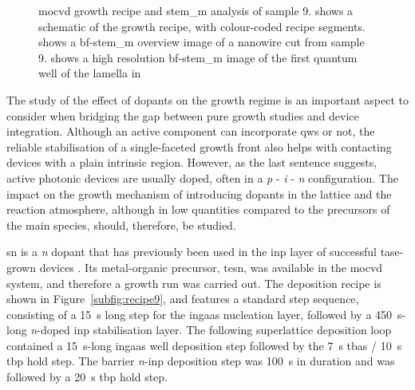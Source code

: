 \begin{figure}
{    }
    \caption{\acs{mocvd} growth recipe and \acs{stem_m} analysis of sample 9.  shows a schematic of the growth recipe, with colour-coded recipe segments.  shows a \acs{bf}-\acs{stem_m} overview image of a nanowire cut from sample 9.  shows a high resolution \acs{bf}-\acs{stem_m} image of the first quantum well of the lamella in }
    \label{fig:s9_recipe_stem}
\end{figure}

The study of the effect of dopants on the  growth regime is an important aspect to consider when bridging the gap between pure growth studies and device integration. Although an active component can incorporate \acl{qw}s or not, the reliable stabilisation of a single-faceted growth front also helps with contacting devices with a plain intrinsic region. However, as the last sentence suggests, active photonic devices are usually doped, often in a \textit{p} - \textit{i} - \textit{n} configuration. The impact on the growth mechanism of introducing dopants in the lattice and the reaction atmosphere, although in low quantities compared to the precursors of the main species, should, therefore, be studied.

\Acl{sn} is a \textit{n} dopant \cite{Vedel2023} that has previously been used in the \acs{inp} layer of successful \acs{tase}-grown devices \cite{Wen2022}. Its metal-organic precursor, \acf{tesn}, was available in the \acs{mocvd} system, and therefore a growth run was carried out. The deposition recipe is shown in Figure~\ref{subfig:recipe9}, and features a standard step sequence, consisting of a \qty{15}{\second} long step for the \acs{ingaas} nucleation layer, followed by a \qty{450}{\second}-long \textit{n}-doped \acs{inp} stabilisation layer. The following superlattice deposition loop contained a \qty{15}{\second}-long \acs{ingaas} well deposition step followed by the \qty{7}{\second} \acs{tbas} / \qty{10}{\second} \acs{tbp} hold step. The barrier \textit{n}-\acs{inp} deposition step was \qty{100}{\second} in duration and was followed by a \qty{20}{\second} \acs{tbp} hold step.

